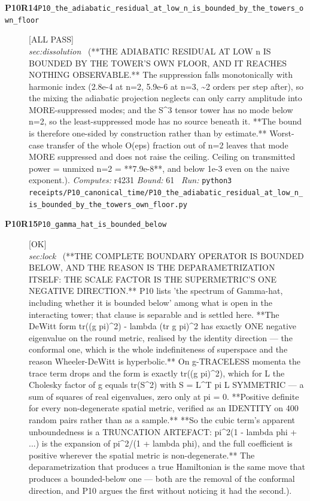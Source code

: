 \begin{description}
\item[\textbf{P10R14}\quad\texttt{P10\_the\_adiabatic\_residual\_at\_low\_n\_is\_bounded\_by\_the\_towers\_own\_floor}]\hfill\textsf{[ALL PASS]}\\
\textit{sec:dissolution} \ (**THE ADIABATIC RESIDUAL AT LOW n IS BOUNDED BY THE TOWER'S OWN FLOOR, AND IT REACHES NOTHING OBSERVABLE.** The suppression falls monotonically with harmonic index (2.8e-4 at n=2, 5.9e-6 at n=3, \textasciitilde{}2 orders per step after), so the mixing the adiabatic projection neglects can only carry amplitude into MORE-suppressed modes; and the S\textasciicircum{}3 tensor tower has no mode below n=2, so the least-suppressed mode has no source beneath it. **The bound is therefore one-sided by construction rather than by estimate.** Worst-case transfer of the whole O(eps) fraction out of n=2 leaves that mode MORE suppressed and does not raise the ceiling. Ceiling on transmitted power = unmixed n=2 = **7.9e-8**, and below 1e-3 even on the naive exponent.). 
\emph{Computes:} r4231
 \emph{Bound:} 61
\ \emph{Run:} \texttt{python3 receipts/P10\_canonical\_time/P10\_the\_adiabatic\_residual\_at\_low\_n\_is\_bounded\_by\_the\_towers\_own\_floor.py}
\item[\textbf{P10R15}\quad\texttt{P10\_gamma\_hat\_is\_bounded\_below}]\hfill\textsf{[OK]}\\
\textit{sec:lock} \ (**THE COMPLETE BOUNDARY OPERATOR IS BOUNDED BELOW, AND THE REASON IS THE DEPARAMETRIZATION ITSELF: THE SCALE FACTOR IS THE SUPERMETRIC'S ONE NEGATIVE DIRECTION.** P10 lists 'the spectrum of Gamma-hat, including whether it is bounded below' among what is open in the interacting tower; that clause is separable and is settled here. **The DeWitt form tr((g pi)\textasciicircum{}2) - lambda (tr g pi)\textasciicircum{}2 has exactly ONE negative eigenvalue on the round metric, realised by the identity direction --- the conformal one, which is the whole indefiniteness of superspace and the reason Wheeler-DeWitt is hyperbolic.** On g-TRACELESS momenta the trace term drops and the form is exactly tr((g pi)\textasciicircum{}2), which for L the Cholesky factor of g equals tr(S\textasciicircum{}2) with S = L\textasciicircum{}T pi L SYMMETRIC --- a sum of squares of real eigenvalues, zero only at pi = 0. **Positive definite for every non-degenerate spatial metric, verified as an IDENTITY on 400 random pairs rather than as a sample.** **So the cubic term's apparent unboundedness is a TRUNCATION ARTEFACT: pi\textasciicircum{}2(1 - lambda phi + ...) is the expansion of pi\textasciicircum{}2/(1 + lambda phi), and the full coefficient is positive wherever the spatial metric is non-degenerate.** The deparametrization that produces a true Hamiltonian is the same move that produces a bounded-below one --- both are the removal of the conformal direction, and P10 argues the first without noticing it had the second.). 

\end{description}
